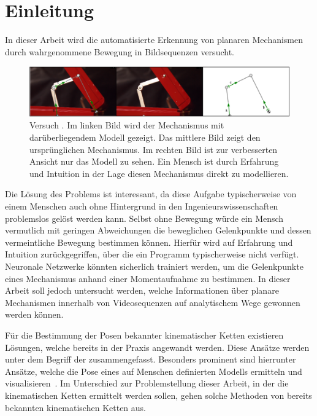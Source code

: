 %

\chapter{Einleitung}
\label{ch:einleitung}

In dieser Arbeit wird die automatisierte Erkennung von planaren Mechanismen durch wahrgenommene Bewegung in Bildsequenzen versucht.

\begin{figure}
\centering
    \includegraphics[width=\textwidth]{gfx/werkzeugkoffer_impl.png}
    \caption[Versuch ]{Versuch . Im linken Bild wird der Mechanismus mit darüberliegendem  Modell gezeigt. Das mittlere Bild zeigt den ursprünglichen Mechanismus. Im rechten Bild ist zur verbesserten Ansicht nur das  Modell zu sehen. Ein Mensch ist durch Erfahrung und Intuition in der Lage diesen Mechanismus direkt zu modellieren.}
    \label{fig:werkzeugkoffer_impl}
\end{figure}

Die Lösung des Problems ist interessant, da diese Aufgabe typischerweise von einem Menschen auch ohne Hintergrund in den Ingenieurswissenschaften problemslos gelöst werden kann.
Selbst ohne Bewegung würde ein Mensch vermutlich mit geringen Abweichungen die beweglichen Gelenkpunkte und dessen vermeintliche Bewegung bestimmen können.
Hierfür wird auf Erfahrung und Intuition zurückgegriffen, über die ein Programm typischerweise nicht verfügt.
Neuronale Netzwerke könnten sicherlich trainiert werden, um die Gelenkpunkte eines Mechanismus anhand einer Momentaufnahme zu bestimmen.
In dieser Arbeit soll jedoch untersucht werden, welche Informationen über planare Mechanismen innerhalb von Videosequenzen auf analytischem Wege gewonnen werden können.

Für die Bestimmung der Posen bekannter kinematischer Ketten existieren Lösungen, welche bereits in der Praxis angewandt werden.
Diese Ansätze werden unter dem Begriff der  zusammengefasst.
Besonders prominent sind hierrunter Ansätze, welche die Pose eines auf Menschen definierten Modells ermitteln und visualisieren~\cite{Papandreou2018, Google2021, Google2021a}.
Im Unterschied zur Problemstellung dieser Arbeit, in der die kinematischen Ketten ermittelt werden sollen, gehen solche Methoden von bereits bekannten kinematischen Ketten aus.

